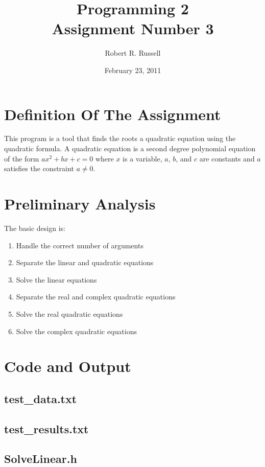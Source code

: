 \documentclass[letterpaper,oneside]{scrartcl}
\title{Programming 2\\Assignment Number 3}
\author{Robert R. Russell}
\date{February 23, 2011}
\begin{document}
\maketitle

\section{Definition Of The Assignment}
This program is a tool that finds the roots a quadratic equation using the quadratic formula.
A quadratic equation is a second degree polynomial equation of the form $ax^2 + bx + c = 0$ where $x$
is a variable, $a$, $b$, and $c$ are constants and $a$ satisfies the constraint $a \neq 0$.

\section{Preliminary Analysis}
The basic design is:
\begin{enumerate}
  \item Handle the correct number of arguments
  \item Separate the linear and quadratic equations
  \item Solve the linear equations
  \item Separate the real and complex quadratic equations
  \item Solve the real quadratic equations
  \item Solve the complex quadratic equations
\end{enumerate}
\newpage

\section{Code and Output}

\subsection{test\_data.txt}

\subsection{test\_results.txt}

\subsection{SolveLinear.h}
\end{document}
